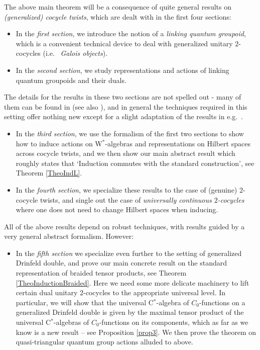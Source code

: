\documentclass[reqno]{amsart}
\numberwithin{equation}{section}
\begin{document}
The above main theorem will be a consequence of quite general results on \emph{(generalized) cocycle twists}, which are dealt with in the first four sections:
\begin{itemize}
\item In the \emph{first section}, we introduce the notion of a \emph{linking quantum groupoid}, which is a convenient technical device to deal with generalized  unitary $2$-cocycles (i.e.~ \emph{Galois objects}).
\item  In the \emph{second section}, we study representations and actions of linking quantum groupoids and their duals. 
\end{itemize}
The details for the results in these two sections are not spelled out - many of them can be found in \cite{DC09} (see also \cite{BC17}), and in general the techniques required in this setting offer nothing new except for a slight adaptation of the results in  e.g.\ \cites{KV00,Kus01,KV03,Vae01}.
\begin{itemize}
\item In the \emph{third section}, we use the formalism of the first two sections to show how to induce actions on W$^*$-algebras and representations on Hilbert spaces across cocycle twists, and we then show our main abstract result which roughly states that `Induction commutes with the standard construction', see Theorem \ref{TheoIndL}. 
\item In the \emph{fourth section}, we specialize these results to the case of (genuine) $2$-cocycle twists, and single out the case of \emph{universally continuous $2$-cocycles} where one does not need to change Hilbert spaces when inducing. 
\end{itemize}
All of the above results depend on robust techniques, with results guided by a very general abstract formalism. However: 
\begin{itemize}
\item In the \emph{fifth section} we specialize even further to the setting of generalized Drinfeld double, and prove our main concrete result on the standard representation of braided tensor products, see Theorem \ref{TheoInductionBraided}. Here we need some more delicate machinery to lift certain dual unitary $2$-cocycles to the appropriate universal level. In particular, we will show that the universal C$^*$-algebra of $C_0$-functions on a generalized Drinfeld double is given by the maximal tensor product of the universal C$^*$-algebras of $C_0$-functions on its components, which as far as we know is a new result -- see Proposition \ref{prop3}. We then prove the theorem on quasi-triangular quantum group actions alluded to above.
\end{itemize}
\end{document}
